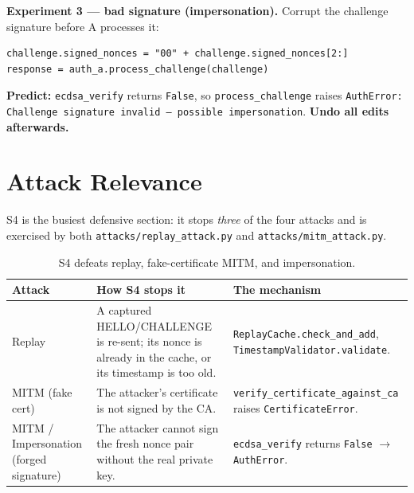 \documentclass[11pt,a4paper]{article}
\begin{document}
\textbf{Experiment 3 --- bad signature (impersonation).} Corrupt the challenge
signature before A processes it:
\begin{lstlisting}[style=term]
challenge.signed_nonces = "00" + challenge.signed_nonces[2:]
response = auth_a.process_challenge(challenge)
\end{lstlisting}
\textbf{Predict:} \texttt{ecdsa\_verify} returns \texttt{False}, so
\texttt{process\_challenge} raises \texttt{AuthError: Challenge signature invalid
-- possible impersonation}. \textbf{Undo all edits afterwards.}

\section{Attack Relevance}

S4 is the busiest defensive section: it stops \emph{three} of the four attacks
and is exercised by both \texttt{attacks/replay\_attack.py} and
\texttt{attacks/mitm\_attack.py}.

\begin{table}[h]
\centering
\small
\begin{tabular}{@{}p{2.5cm} p{6.0cm} p{5.0cm}@{}}
\toprule
\textbf{Attack} & \textbf{How S4 stops it} & \textbf{The mechanism}\\
\midrule
Replay & A captured HELLO/CHALLENGE is re-sent; its nonce is already in the
cache, or its timestamp is too old. & \texttt{ReplayCache.check\_and\_add},
\texttt{TimestampValidator.validate}.\\
MITM (fake cert) & The attacker's certificate is not signed by the CA. &
\texttt{verify\_certificate\_against\_ca} raises \texttt{CertificateError}.\\
MITM / Impersonation (forged signature) & The attacker cannot sign the fresh
nonce pair without the real private key. & \texttt{ecdsa\_verify} returns
\texttt{False} $\to$ \texttt{AuthError}.\\
\bottomrule
\end{tabular}
\caption{S4 defeats replay, fake-certificate MITM, and impersonation.}
\end{table}
\end{document}
